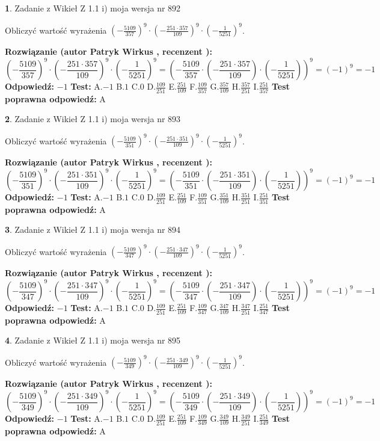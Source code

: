 \documentclass[12pt, a4paper]{article}
\theoremstyle{definition} %
\newtheorem{zad}{}
\newcommand{\zadStart}[1]{\begin{zad}#1\newline}
\newcommand{\zadStop}{\end{zad}}
\newcommand{\rozwStart}[2]{\noindent \textbf{Rozwiązanie (autor #1 , recenzent #2): }\newline}
\newcommand{\rozwStop}{\newline}
\newcommand{\odpStart}{\noindent \textbf{Odpowiedź:}\newline}
\newcommand{\odpStop}{\newline}
\newcommand{\testStart}{\noindent \textbf{Test:}\newline}
\newcommand{\testStop}{\newline}
\newcommand{\kluczStart}{\noindent \textbf{Test poprawna odpowiedź:}\newline}
\newcommand{\kluczStop}{\newline}
\begin{document}
\zadStart{Zadanie z Wikieł Z 1.1 i) moja wersja nr 892}

Obliczyć wartość wyrażenia $(-\frac{5109}{357})^{9} \cdot (-\frac{251 \cdot 357}{109})^{9} \cdot (-\frac{1}{5251})^{9}$.
\zadStop
\rozwStart{Patryk Wirkus}{}
$$(-\frac{5109}{357})^{9} \cdot (-\frac{251 \cdot 357}{109})^{9} \cdot (-\frac{1}{5251})^{9} = (-\frac{5109}{357} \cdot (-\frac{251 \cdot 357}{109}) \cdot (-\frac{1}{5251}))^{9} = (-1)^{9} = -1$$
\rozwStop
\odpStart
$-1$
\odpStop
\testStart
A.$-1$ B.$1$ C.$0$ D.$\frac{109}{251}$ E.$\frac{251}{109}$
F.$\frac{109}{357}$ G.$\frac{357}{109}$
H.$\frac{357}{251}$
I.$\frac{251}{357}$
\testStop
\kluczStart
A
\kluczStop



\zadStart{Zadanie z Wikieł Z 1.1 i) moja wersja nr 893}

Obliczyć wartość wyrażenia $(-\frac{5109}{351})^{9} \cdot (-\frac{251 \cdot 351}{109})^{9} \cdot (-\frac{1}{5251})^{9}$.
\zadStop
\rozwStart{Patryk Wirkus}{}
$$(-\frac{5109}{351})^{9} \cdot (-\frac{251 \cdot 351}{109})^{9} \cdot (-\frac{1}{5251})^{9} = (-\frac{5109}{351} \cdot (-\frac{251 \cdot 351}{109}) \cdot (-\frac{1}{5251}))^{9} = (-1)^{9} = -1$$
\rozwStop
\odpStart
$-1$
\odpStop
\testStart
A.$-1$ B.$1$ C.$0$ D.$\frac{109}{251}$ E.$\frac{251}{109}$
F.$\frac{109}{351}$ G.$\frac{351}{109}$
H.$\frac{351}{251}$
I.$\frac{251}{351}$
\testStop
\kluczStart
A
\kluczStop



\zadStart{Zadanie z Wikieł Z 1.1 i) moja wersja nr 894}

Obliczyć wartość wyrażenia $(-\frac{5109}{347})^{9} \cdot (-\frac{251 \cdot 347}{109})^{9} \cdot (-\frac{1}{5251})^{9}$.
\zadStop
\rozwStart{Patryk Wirkus}{}
$$(-\frac{5109}{347})^{9} \cdot (-\frac{251 \cdot 347}{109})^{9} \cdot (-\frac{1}{5251})^{9} = (-\frac{5109}{347} \cdot (-\frac{251 \cdot 347}{109}) \cdot (-\frac{1}{5251}))^{9} = (-1)^{9} = -1$$
\rozwStop
\odpStart
$-1$
\odpStop
\testStart
A.$-1$ B.$1$ C.$0$ D.$\frac{109}{251}$ E.$\frac{251}{109}$
F.$\frac{109}{347}$ G.$\frac{347}{109}$
H.$\frac{347}{251}$
I.$\frac{251}{347}$
\testStop
\kluczStart
A
\kluczStop



\zadStart{Zadanie z Wikieł Z 1.1 i) moja wersja nr 895}

Obliczyć wartość wyrażenia $(-\frac{5109}{349})^{9} \cdot (-\frac{251 \cdot 349}{109})^{9} \cdot (-\frac{1}{5251})^{9}$.
\zadStop
\rozwStart{Patryk Wirkus}{}
$$(-\frac{5109}{349})^{9} \cdot (-\frac{251 \cdot 349}{109})^{9} \cdot (-\frac{1}{5251})^{9} = (-\frac{5109}{349} \cdot (-\frac{251 \cdot 349}{109}) \cdot (-\frac{1}{5251}))^{9} = (-1)^{9} = -1$$
\rozwStop
\odpStart
$-1$
\odpStop
\testStart
A.$-1$ B.$1$ C.$0$ D.$\frac{109}{251}$ E.$\frac{251}{109}$
F.$\frac{109}{349}$ G.$\frac{349}{109}$
H.$\frac{349}{251}$
I.$\frac{251}{349}$
\testStop
\kluczStart
A
\kluczStop
\end{document}
